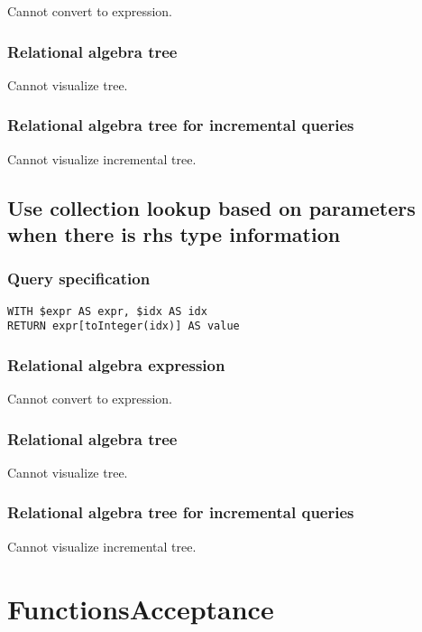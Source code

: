 Cannot convert to expression.

\subsubsection*{Relational algebra tree}

Cannot visualize tree.

\subsubsection*{Relational algebra tree for incremental queries}

Cannot visualize incremental tree.

\subsection{Use collection lookup based on parameters when there is rhs type information}

\subsubsection*{Query specification}

\begin{lstlisting}
WITH $expr AS expr, $idx AS idx
RETURN expr[toInteger(idx)] AS value
\end{lstlisting}

\subsubsection*{Relational algebra expression}

Cannot convert to expression.

\subsubsection*{Relational algebra tree}

Cannot visualize tree.

\subsubsection*{Relational algebra tree for incremental queries}

Cannot visualize incremental tree.

\section{FunctionsAcceptance}


